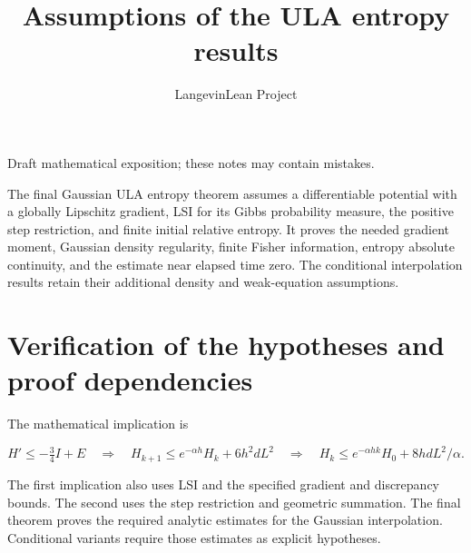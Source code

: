 \documentclass[11pt,a4paper]{article}
\title{\texorpdfstring{Assumptions of the ULA entropy results}{Assumptions of the ULA entropy results}}
\author{LangevinLean Project}
\date{}
\begin{document}
\maketitle
Draft mathematical exposition; these notes may contain mistakes.


The final Gaussian ULA entropy theorem assumes a differentiable potential with a globally Lipschitz gradient, LSI for its Gibbs probability measure, the positive step restriction, and finite initial relative entropy. It proves the needed gradient moment, Gaussian density regularity, finite Fisher information, entropy absolute continuity, and the estimate near elapsed time zero. The conditional interpolation results retain their additional density and weak-equation assumptions.


\section{\texorpdfstring{Verification of the hypotheses and proof dependencies}{Verification of the hypotheses and proof dependencies}}


The mathematical implication is

\[H'\le-\tfrac34I+E\quad\Longrightarrow\quad H_{k+1}\le e^{-\alpha h}H_k+6h^2dL^2\quad\Longrightarrow\quad H_k\le e^{-\alpha hk}H_0+8hdL^2/\alpha.\]

The first implication also uses LSI and the specified gradient and discrepancy bounds. The second uses the step restriction and geometric summation. The final theorem proves the required analytic estimates for the Gaussian interpolation. Conditional variants require those estimates as explicit hypotheses.
\end{document}
